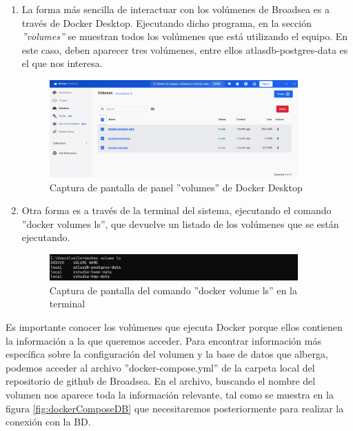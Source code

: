 \documentclass{article}
\begin{document}
\begin{enumerate}

    \item La forma más sencilla de interactuar con los volúmenes de Broadsea es a través de Docker Desktop. Ejecutando dicho programa, en la sección \textit{''volumes''} se muestran todos los volúmenes que está utilizando el equipo. En este caso, deben aparecer tres volúmenes, entre ellos atlasdb-postgres-data es el que nos interesa.

\begin{figure}[H]
    \centering
    \includegraphics[width=0.90\textwidth]{images/dockerVolumes.png}
     \caption{Captura de pantalla de panel ''volumes'' de Docker Desktop}
    \label{fig:dockerVolumes}
\end{figure}

    \item Otra forma es a través de la terminal del sistema, ejecutando el comando ''docker volumes ls'', que devuelve un listado de los volúmenes que se están ejecutando.
    
\begin{figure}[H]
    \centering
    \includegraphics[width=0.90\textwidth]{images/dockerVolumesCDM.png}
     \caption{Captura de pantalla del comando ''docker volume ls'' en la terminal}
    \label{fig:dockerVolumesCDM}
\end{figure}
    
\end{enumerate}

Es importante conocer los volúmenes que ejecuta Docker porque ellos contienen la información a la que queremos acceder. Para encontrar información más específica sobre la configuración del volumen y la base de datos que alberga, podemos acceder al archivo ''docker-compose.yml'' de la carpeta local del repositorio de github de Broadsea. En el archivo, buscando el nombre del volumen nos aparece toda la información relevante, tal como se muestra en la figura \ref{fig:dockerComposeDB} que necesitaremos posteriormente para realizar la conexión con la BD.
\end{document}

